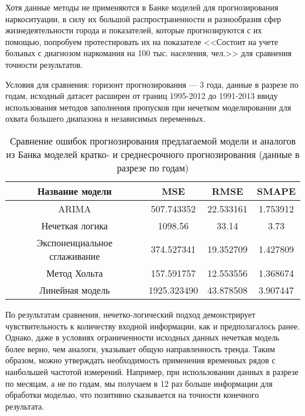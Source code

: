Хотя данные методы не применяются в Банке моделей для прогнозирования
наркоситуации, в силу их большой распространенности и разнообразия сфер
жизнедеятельности города и показателей, которые прогнозируются с их помощью,
попробуем протестировать их на показателе <<Состоит на учете больных с диагнозом
наркомания на 100 тыс. населения, чел.>> для сравнения точности результатов.

Условия для сравнения: горизонт прогнозирования --- 3 года, данные в разрезе по
годам, исходный датасет расширен от границ 1995-2012 до 1991-2013 ввиду
использования методов заполнения пропусков при нечетком моделировании для
охвата большего диапазона в независимых переменных.

\begin{table}[bhtp]
    \caption{Сравнение ошибок прогнозирования предлагаемой модели и аналогов из
        Банка моделей кратко- и среднесрочного прогнозирования (данные в разрезе
        по годам)}
        \begin{tabular}{ | c | c | c | c | }
            \hline
            Название модели & MSE & RMSE & SMAPE \\
            \hline
            ARIMA & 507.743352 & 22.533161 & 1.753912\\
            \hline
            Нечеткая логика & 1098.56 & 33.14 & 3.73 \\
            \hline
            Экспоненциальное сглаживание & 374.527341 & 19.352709 & 1.427809\\
            \hline
            Метод Хольта & 157.591757 & 12.553556 & 1.368674\\
            \hline
            Линейная модель & 1925.323490 & 43.878508 & 3.907447\\
            \hline
        \end{tabular}
    \label{table:short_model_comparison}
\end{table}

По результатам сравнения, нечетко-логический подход демонстрирует
чувствительность к количеству входной информации, как и предполагалось ранее.
Однако, даже в условиях ограниченности исходных данных нечеткая модель более
верно, чем аналоги, указывает общую направленность тренда. Таким образом, можно
утверждать необходимость применения временных рядов с наибольшей частотой
измерений. Например, при использовании данных в разрезе по месяцам, а не по
годам, мы получаем в 12 раз больше информации для обработки моделью, что
позитивно сказывается на точности конечного результата.


